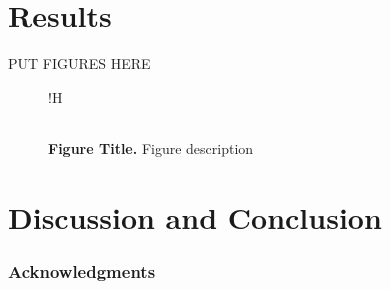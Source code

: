 \documentclass{article} %
\begin{document}
\section{Results}
PUT FIGURES HERE

\begin{figure}{!H}
\centering
\begin{tabular}{cc}
\end{tabular}
\caption{\textbf{Figure Title.} Figure description}
\end{figure}


\section{Discussion and Conclusion}


\subsubsection*{Acknowledgments}



\end{document}
